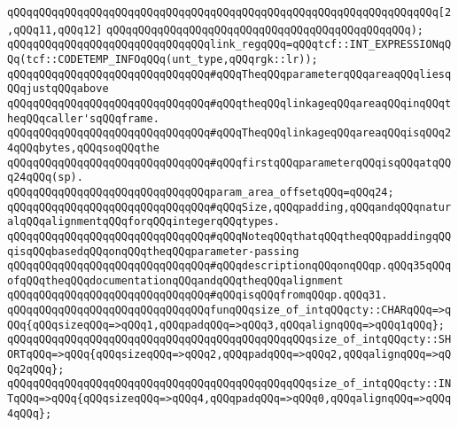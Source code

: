 \verb|qQQqqQQqqQQqqQQqqQQqqQQqqQQqqQQqqQQqqQQqqQQqqQQqqQQqqQQqqQQqqQQqqQQq[2,qQQq11,qQQq12]|\newline
\verb|qQQqqQQqqQQqqQQqqQQqqQQqqQQqqQQqqQQqqQQqqQQqqQQq);|\newline
\newline
\verb|qQQqqQQqqQQqqQQqqQQqqQQqqQQqqQQqlink_regqQQq=qQQqtcf::INT_EXPRESSIONqQQq(tcf::CODETEMP_INFOqQQq(unt_type,qQQqrgk::lr));|\newline
\newline
\verb|qQQqqQQqqQQqqQQqqQQqqQQqqQQqqQQq#qQQqTheqQQqparameterqQQqareaqQQqliesqQQqjustqQQqabove|\newline
\verb|qQQqqQQqqQQqqQQqqQQqqQQqqQQqqQQq#qQQqtheqQQqlinkageqQQqareaqQQqinqQQqtheqQQqcaller'sqQQqframe.|\newline
\verb|qQQqqQQqqQQqqQQqqQQqqQQqqQQqqQQq#qQQqTheqQQqlinkageqQQqareaqQQqisqQQq24qQQqbytes,qQQqsoqQQqthe|\newline
\verb|qQQqqQQqqQQqqQQqqQQqqQQqqQQqqQQq#qQQqfirstqQQqparameterqQQqisqQQqatqQQq24qQQq(sp).|\newline
\newline
\verb|qQQqqQQqqQQqqQQqqQQqqQQqqQQqqQQqparam_area_offsetqQQq=qQQq24;|\newline
\newline
\verb|qQQqqQQqqQQqqQQqqQQqqQQqqQQqqQQq#qQQqSize,qQQqpadding,qQQqandqQQqnaturalqQQqalignmentqQQqforqQQqintegerqQQqtypes.|\newline
\verb|qQQqqQQqqQQqqQQqqQQqqQQqqQQqqQQq#qQQqNoteqQQqthatqQQqtheqQQqpaddingqQQqisqQQqbasedqQQqonqQQqtheqQQqparameter-passing|\newline
\verb|qQQqqQQqqQQqqQQqqQQqqQQqqQQqqQQq#qQQqdescriptionqQQqonqQQqp.qQQq35qQQqofqQQqtheqQQqdocumentationqQQqandqQQqtheqQQqalignment|\newline
\verb|qQQqqQQqqQQqqQQqqQQqqQQqqQQqqQQq#qQQqisqQQqfromqQQqp.qQQq31.|\newline
\newline
\verb|qQQqqQQqqQQqqQQqqQQqqQQqqQQqqQQqfunqQQqsize_of_intqQQqcty::CHARqQQq=>qQQq{qQQqsizeqQQq=>qQQq1,qQQqpadqQQq=>qQQq3,qQQqalignqQQq=>qQQq1qQQq};|\newline
\verb|qQQqqQQqqQQqqQQqqQQqqQQqqQQqqQQqqQQqqQQqqQQqqQQqsize_of_intqQQqcty::SHORTqQQq=>qQQq{qQQqsizeqQQq=>qQQq2,qQQqpadqQQq=>qQQq2,qQQqalignqQQq=>qQQq2qQQq};|\newline
\verb|qQQqqQQqqQQqqQQqqQQqqQQqqQQqqQQqqQQqqQQqqQQqqQQqsize_of_intqQQqcty::INTqQQq=>qQQq{qQQqsizeqQQq=>qQQq4,qQQqpadqQQq=>qQQq0,qQQqalignqQQq=>qQQq4qQQq};|\newline
